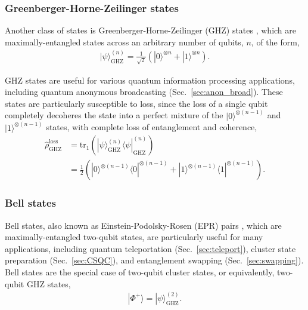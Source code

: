 \documentclass[aps, rmp, twocolumn, amsmath, amssymb, nofootinbib, superscriptaddress, longbibliography, floatfix, table-of-contents, eqsecnum]{revtex4-1}
\newcommand{\bra}[1]{\langle#1|}
\newcommand{\ket}[1]{|#1\rangle}
\begin{document}
%
%

\subsubsection{Greenberger-Horne-Zeilinger states} 

Another class of states is Greenberger-Horne-Zeilinger (GHZ) states \cite{bib:GHZ89}, which are maximally-entangled states across an arbitrary number of qubits, $n$, of the form,
\begin{align}
\ket\psi_\text{GHZ}^{(n)} = \frac{1}{\sqrt{2}}(\ket{0}^{\otimes n} + \ket{1}^{\otimes n}).
\end{align}

GHZ states are useful for various quantum information processing applications, including quantum anonymous broadcasting (Sec.~\ref{sec:anon_broad}). These states are particularly susceptible to loss, since the loss of a single qubit completely decoheres the state into a perfect mixture of the \mbox{$\ket{0}^{\otimes (n-1)}$} and \mbox{$\ket{1}^{\otimes (n-1)}$} states, with complete loss of entanglement and coherence,
\begin{align}
\hat\rho_\text{GHZ}^\text{loss} &= \text{tr}_1(\ket\psi_\text{GHZ}^{(n)}\bra\psi_\text{GHZ}^{(n)})\nonumber \\
&= \frac{1}{2}(\ket{0}^{\otimes (n-1)}\bra{0}^{\otimes (n-1)}+\ket{1}^{\otimes (n-1)}\bra{1}^{\otimes (n-1)}).
\end{align}

%
%

\subsubsection{Bell states} \label{sec:bell_state_res} 

Bell states, also known as Einstein-Podolsky-Rosen (EPR) pairs \cite{bib:EPR35}, which are maximally-entangled two-qubit states, are particularly useful for many applications, including quantum teleportation (Sec.~\ref{sec:teleport}), cluster state preparation (Sec.~\ref{sec:CSQC}), and entanglement swapping (Sec.~\ref{sec:swapping}). Bell states are the special case of two-qubit cluster states, or equivalently, two-qubit GHZ states,
\begin{align}
	\ket{\Phi^+} = \ket\psi_\text{GHZ}^{(2)}.
\end{align}
\end{document}
